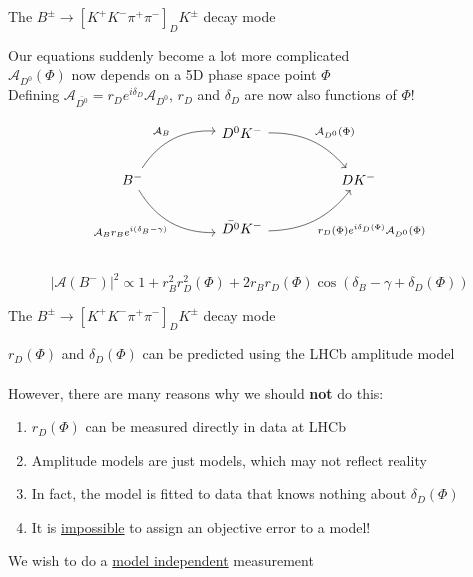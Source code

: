 \documentclass{beamer}
\begin{document}
\begin{frame}[fragile]{The $B^\pm\to[K^+K^-\pi^+\pi^-]_DK^\pm$ decay mode}
  \begin{center}
    Our equations suddenly become a lot more complicated\\
    \vspace{0.2cm}
    $\mathcal{A}_{D^0}(\Phi)$ now depends on a 5D phase space point $\Phi$\\
    \vspace{0.2cm}
    Defining $\mathcal{A}_{\bar{D^0}} = r_De^{i\delta_D}\mathcal{A}_{D^0}$, $r_D$ and $\delta_D$ are now also functions of $\Phi$!
  \end{center}
  \begin{equation*}
    \begin{tikzcd}[column sep=huge]
      & D^0K^- \arrow[dr, bend left = 25, "\mathcal{A}_{D^0}(\Phi)"] & \\
      B^- \arrow[ur, bend left, "\mathcal{A}_B"] \arrow[dr, bend right, "\mathcal{A}_B r_B e^{i(\delta_B - \gamma)}"'] & [5cm] & DK^- \\
      & \bar{D^0}K^- \arrow[ur, bend right = 25, "r_D(\Phi)e^{i\delta_D(\Phi)}\mathcal{A}_{D^0}(\Phi)"'] & \\
    \end{tikzcd}
  \end{equation*}
  \vspace{-0.5cm}
  \begin{equation*}
    \lvert\mathcal{A}(B^-)\lvert^2\propto1 + r_B^2r_D^2(\Phi) + 2r_Br_D(\Phi)\cos(\delta_B - \gamma + \delta_D(\Phi))
  \end{equation*}
\end{frame}

\begin{frame}{The $B^\pm\to[K^+K^-\pi^+\pi^-]_DK^\pm$ decay mode}
  \begin{center}
    \Large $r_D(\Phi)$ and $\delta_D(\Phi)$ can be predicted using the LHCb amplitude model\\~\\
    \large However, there are many reasons why we should \textbf{not} do this:
  \end{center}
  \begin{enumerate}
    \setlength\itemsep{1.0em}
    \item{$r_D(\Phi)$ can be measured directly in data at LHCb}
    \item{Amplitude models are just models, which may not reflect reality}
    \item{In fact, the model is fitted to data that knows nothing about $\delta_D(\Phi)$}
    \item{It is \underline{impossible} to assign an objective error to a model!}
  \end{enumerate}
  \begin{center}
    \large We wish to do a \underline{model independent} measurement
  \end{center}
\end{frame}
\end{document}
